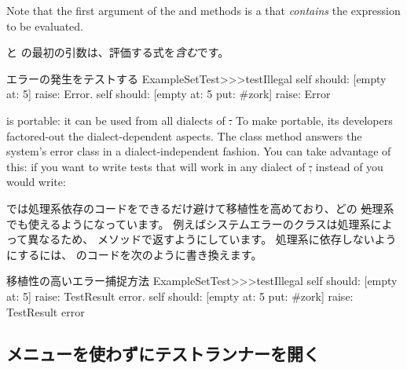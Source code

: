 \documentclass[a4paper,10pt,twoside]{book}
\begin{document}


Note that the first argument of the  and  methods is a  that \emph{contains} the expression to be evaluated.   
\fi

 と  の最初の引数は、評価する式を\emph{含む}です。

\begin{method}[ESTtestIllegal]{エラーの発生をテストする}
ExampleSetTest>>>testIllegal
	self should: [empty at: 5] raise: Error.
	self should: [empty at: 5 put: #zork] raise: Error
\end{method}

\sunit is portable: it can be used from all dialects of \st.  To make
\sunit portable, its developers factored-out the dialect-dependent aspects.  The class method  answers
the system's error class in a dialect-independent fashion. 
You can take advantage of this: if you want to write tests that will work in any dialect of \st, instead of 
 you would write:
\fi

\sunit では処理系依存のコードをできるだけ避けて移植性を高めており、どの \st 処理系でも使えるようになっています。
例えばシステムエラーのクラスは処理系によって異なるため、  メソッドで返すようにしています。
処理系に依存しないようにするには、  のコードを次のように書き換えます。

\begin{method}[portabletestillegal]{移植性の高いエラー捕捉方法}
ExampleSetTest>>>testIllegal
	self should: [empty at: 5] raise: TestResult error.
	self should: [empty at: 5 put: #zork] raise: TestResult error
\end{method}


\subsection{メニューを使わずにテストランナーを開く}
\end{document}
